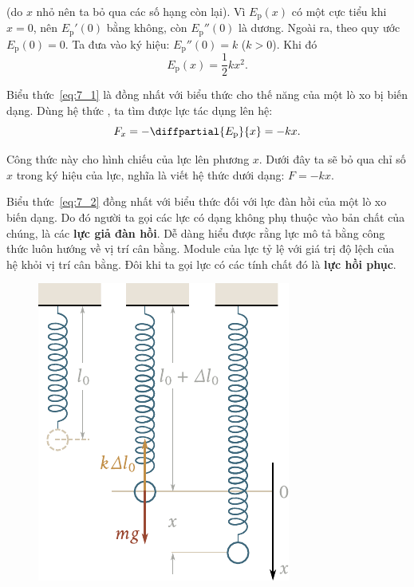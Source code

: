 \noindent
(do $x$ nhỏ nên ta bỏ qua các số hạng còn lại). Vì $E_{\text{p}}(x)$ có một cực tiểu khi $x=0$, nên $E_{\text{p}}'(0)$ bằng không, còn $E_{\text{p}}''(0)$ là dương. Ngoài ra, theo quy ước $E_{\text{p}}(0)=0$. Ta đưa vào ký hiệu: $E_{\text{p}}''(0)=k$ ($k>0$). Khi đó
\begin{equation}\label{eq:7_1}
	E_{\text{p}}(x) = \frac{1}{2}kx^2.
\end{equation}

Biểu thức~\eqref{eq:7_1} là đồng nhất với biểu thức  cho thế năng của một lò xo bị biến dạng. Dùng hệ thức , ta tìm được lực tác dụng lên hệ:
\begin{equation}\label{eq:7_2}
	F_x = -\diffpartial{E_{\text{p}}}{x} = -kx.
\end{equation}

Công thức này cho hình chiếu của lực lên phương $x$. Dưới đây ta sẽ bỏ qua chỉ số $x$ trong ký hiệu của lực, nghĩa là viết hệ thức  dưới dạng: $F=-kx$.

Biểu thức~\eqref{eq:7_2} đồng nhất với biểu thức  đối với lực đàn hồi của một lò xo biến dạng. Do đó người ta gọi các lực có dạng  không phụ thuộc vào bản chất của chúng, là các \textbf{lực giả đàn hồi}. Dễ dàng hiểu được rằng lực mô tả bằng công thức  luôn hướng về vị trí cân bằng. Module của lực tỷ lệ với giá trị độ lệch của hệ khỏi vị trí cân bằng. Đôi khi ta gọi lực có các tính chất đó là \textbf{lực hồi phục}.

\begin{figure}[!htb]
	\begin{center}
		\includegraphics[scale=0.95]{figures/ch_07/fig_7_1.pdf}
		\caption[]{}
		\label{fig:7_1}
	\end{center}
\end{figure}

